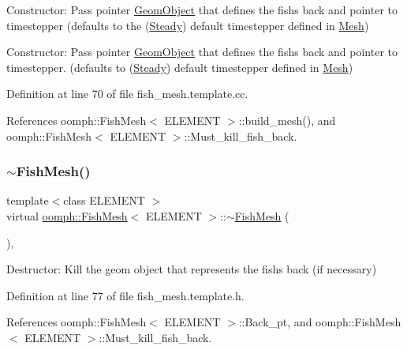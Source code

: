 Constructor\+: Pass pointer \hyperlink{classoomph_1_1GeomObject}{Geom\+Object} that defines the fish\textquotesingle{}s back and pointer to timestepper (defaults to the (\hyperlink{classoomph_1_1Steady}{Steady}) default timestepper defined in \hyperlink{classoomph_1_1Mesh}{Mesh}) 

Constructor\+: Pass pointer \hyperlink{classoomph_1_1GeomObject}{Geom\+Object} that defines the fish\textquotesingle{}s back and pointer to timestepper. (defaults to (\hyperlink{classoomph_1_1Steady}{Steady}) default timestepper defined in \hyperlink{classoomph_1_1Mesh}{Mesh}) 

Definition at line 70 of file fish\+\_\+mesh.\+template.\+cc.



References oomph\+::\+Fish\+Mesh$<$ E\+L\+E\+M\+E\+N\+T $>$\+::build\+\_\+mesh(), and oomph\+::\+Fish\+Mesh$<$ E\+L\+E\+M\+E\+N\+T $>$\+::\+Must\+\_\+kill\+\_\+fish\+\_\+back.

\mbox{\label{classoomph_1_1FishMesh_a3763b9be54c74d15a8c5b2129e0f4fae}} 
\subsubsection{\texorpdfstring{$\sim$\+Fish\+Mesh()}{~FishMesh()}}
{\footnotesize\ttfamily template$<$class E\+L\+E\+M\+E\+NT $>$ \\
virtual \hyperlink{classoomph_1_1FishMesh}{oomph\+::\+Fish\+Mesh}$<$ E\+L\+E\+M\+E\+NT $>$\+::$\sim$\hyperlink{classoomph_1_1FishMesh}{Fish\+Mesh} (\begin{DoxyParamCaption}{ }\end{DoxyParamCaption})\hspace{0.3cm}{\ttfamily [inline]}, {\ttfamily [virtual]}}



Destructor\+: Kill the geom object that represents the fish\textquotesingle{}s back (if necessary) 



Definition at line 77 of file fish\+\_\+mesh.\+template.\+h.



References oomph\+::\+Fish\+Mesh$<$ E\+L\+E\+M\+E\+N\+T $>$\+::\+Back\+\_\+pt, and oomph\+::\+Fish\+Mesh$<$ E\+L\+E\+M\+E\+N\+T $>$\+::\+Must\+\_\+kill\+\_\+fish\+\_\+back.




